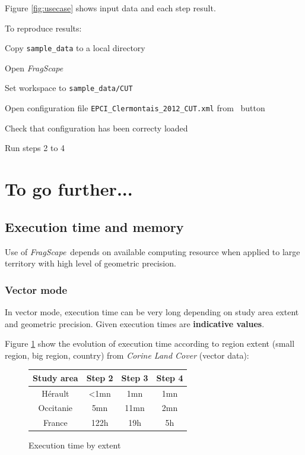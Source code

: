 \documentclass[11pt]{article}
\newcommand{\tool}{\emph{FragScape}}
\let\tempone\itemize
\let\temptwo\enditemize
\renewenvironment{itemize}{\tempone\addtolength{\itemsep}{-0.5\baselineskip}}{\temptwo}
\begin{document}
Figure \ref{fig:usecase} shows input data and each step result.

To reproduce results:
\begin{itemize}
    \item Copy \texttt{sample\_data} to a local directory
    \item Open \tool
    \item Set workspace to \texttt{sample\_data/CUT}
    \item Open configuration file \texttt{EPCI\_Clermontais\_2012\_CUT.xml} from \  button
    \item Check that configuration has been correcty loaded
    \item Run steps 2 to 4
\end{itemize}





\section{To go further...}

\subsection{Execution time and memory}
\label{sec:execTime}

Use of \tool\ depends on available computing resource when applied to large territory with high level of geometric precision.

\subsubsection{Vector mode}

In vector mode, execution time can be very long depending on study area extent and geometric precision. Given execution times are \textbf{indicative values}.

Figure \ref{fig:benchCLC} show the evolution of execution time according to region extent (small region, big region, country) from \emph{Corine Land Cover} (vector data):


\begin{figure}[h!]
\begin{center}
\begin{tabular}{|c|ccc|}
    \hline
    Study area & Step 2 & Step 3 & Step 4\\
    \hline
    Hérault & <1mn & 1mn & 1mn \\
    Occitanie & 5mn & 11mn & 2mn \\
    France & 122h & 19h & 5h \\
    \hline
\end{tabular}
\end{center}
\vspace*{-0.5cm}
\caption{Execution time by extent}
\label{fig:benchCLC}
\end{figure}
\end{document}
